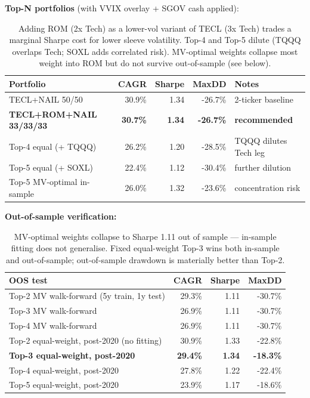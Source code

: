 \documentclass[11pt,a4paper]{article}
\begin{document}
\textbf{Top-N portfolios} (with VVIX overlay + SGOV cash applied):

\begin{table}[H]
\centering
\small
\begin{tabular}{lrrrl}
\toprule
\textbf{Portfolio} & \textbf{CAGR} & \textbf{Sharpe} & \textbf{MaxDD} & \textbf{Notes} \\
\midrule
TECL+NAIL 50/50            & 30.9\% & 1.34 & -26.7\% & 2-ticker baseline \\
\rowcolor{green!10} \textbf{TECL+ROM+NAIL 33/33/33} & \textbf{30.7\%} & \textbf{1.34} & \textbf{-26.7\%} & \textbf{recommended} \\
Top-4 equal (+ TQQQ)       & 26.2\% & 1.20 & -28.5\% & TQQQ dilutes Tech leg \\
Top-5 equal (+ SOXL)       & 22.4\% & 1.12 & -30.4\% & further dilution \\
Top-5 MV-optimal in-sample & 26.0\% & 1.32 & -23.6\% & concentration risk \\
\bottomrule
\end{tabular}
\caption{Adding ROM (2x Tech) as a lower-vol variant of TECL (3x Tech) trades a marginal Sharpe cost for lower sleeve volatility. Top-4 and Top-5 dilute (TQQQ overlaps Tech; SOXL adds correlated risk). MV-optimal weights collapse most weight into ROM but do not survive out-of-sample (see below).}
\end{table}

\textbf{Out-of-sample verification:}

\begin{table}[H]
\centering
\small
\begin{tabular}{lrrr}
\toprule
\textbf{OOS test} & \textbf{CAGR} & \textbf{Sharpe} & \textbf{MaxDD} \\
\midrule
Top-2 MV walk-forward (5y train, 1y test) & 29.3\% & 1.11 & -30.7\% \\
Top-3 MV walk-forward  & 26.9\% & 1.11 & -30.7\% \\
Top-4 MV walk-forward  & 26.9\% & 1.11 & -30.7\% \\
\midrule
Top-2 equal-weight, post-2020 (no fitting) & 30.9\% & 1.33 & -22.8\% \\
\rowcolor{green!10} \textbf{Top-3 equal-weight, post-2020} & \textbf{29.4\%} & \textbf{1.34} & \textbf{-18.3\%} \\
Top-4 equal-weight, post-2020 & 27.8\% & 1.22 & -22.4\% \\
Top-5 equal-weight, post-2020 & 23.9\% & 1.17 & -18.6\% \\
\bottomrule
\end{tabular}
\caption{MV-optimal weights collapse to Sharpe 1.11 out of sample --- in-sample fitting does not generalise. Fixed equal-weight Top-3 wins both in-sample and out-of-sample; out-of-sample drawdown is materially better than Top-2.}
\end{table}
\end{document}
